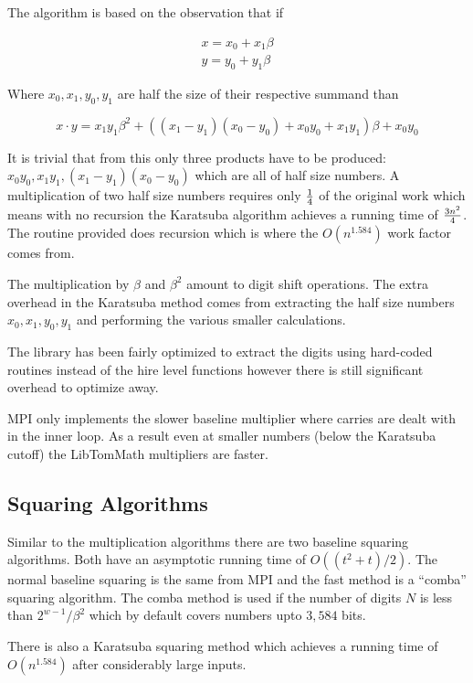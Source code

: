 \documentclass[]{article}
\begin{document}
The algorithm is based on the observation that if 

\begin{eqnarray}
x = x_0 + x_1\beta \nonumber \\
y = y_0 + y_1\beta
\end{eqnarray}

Where $x_0, x_1, y_0, y_1$ are half the size of their respective summand than 

\begin{equation}
x \cdot y = x_1y_1\beta^2 + ((x_1 - y_1)(x_0 - y_0) + x_0y_0 + x_1y_1)\beta + x_0y_0
\end{equation}

It is trivial that from this only three products have to be produced: $x_0y_0, x_1y_1, (x_1-y_1)(x_0-y_0)$ which
are all of half size numbers.  A multiplication of two half size numbers requires only $1 \over 4$ of the
original work which means with no recursion the Karatsuba algorithm achieves a running time of ${3n^2}\over 4$.  
The routine provided does recursion which is where the $O(n^{1.584})$ work factor comes from.

The multiplication by $\beta$ and $\beta^2$ amount to digit shift operations.  
The extra overhead in the Karatsuba method comes from extracting the half size numbers $x_0, x_1, y_0, y_1$ and
performing the various smaller calculations.  

The library has been fairly optimized to extract the digits using hard-coded routines instead of the hire
level functions however there is still significant overhead to optimize away.

MPI only implements the slower baseline multiplier where carries are dealt with in the inner loop.  As a result even at
smaller numbers (below the Karatsuba cutoff) the LibTomMath multipliers are faster.

\subsection{Squaring Algorithms}

Similar to the multiplication algorithms there are two baseline squaring algorithms.  Both have an asymptotic 
running time of $O((t^2 + t)/2)$.  The normal baseline squaring is the same from MPI and the fast method is 
a ``comba'' squaring algorithm.  The comba method is used if the number of digits $N$ is less than 
$2^{w-1}/\beta^2$ which by default covers numbers upto $3,584$ bits.  

There is also a Karatsuba squaring method which achieves a running time of $O(n^{1.584})$ after considerably large
inputs.
\end{document}
